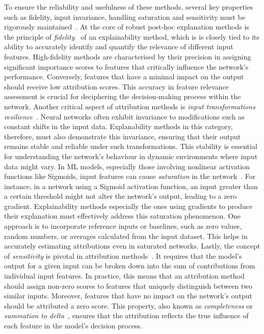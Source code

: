 To ensure the reliability and usefulness of these methods, several key properties such as fidelity, input invariance, handling saturation and sensitivity must be rigorously maintained~\cite{NielsenDRRB22}. At the core of robust post-hoc explanation methods is the principle of \emph{fidelity}~\cite{TomsettHCGP20} of an explainability method, which is is closely tied to its ability to accurately identify and quantify the relevance of different input features. High-fidelity methods are characterised by their precision in assigning significant importance scores to features that critically influence the network's performance. Conversely, features that have a minimal impact on the output should receive low attribution scores. This accuracy in feature relevance assessment is crucial for deciphering the decision-making process within the network. Another critical aspect of attribution methods is \emph{input transformations resilience}~\cite{KindermansHAASDEK19, 11700}. Neural networks often exhibit invariance to modifications such as constant shifts in the input data. Explanability methods in this category, therefore, must also demonstrate this invariance, ensuring that their output remains stable and reliable under such transformations. This stability is essential for understanding the network's behaviour in dynamic environments where input data might vary. In ML models, especially those involving nonlinear activation functions like Sigmoids, input features can cause \emph{saturation} in the network~\cite{SundararajanTY17}. For instance, in a network using a Sigmoid activation function, an input greater than a certain threshold might not alter the network's output, leading to a zero gradient. Explainability methods especially the ones using gradients to produce their explanation must effectively address this saturation phenomenon. One approach is to incorporate reference inputs or baselines, such as zero values, random numbers, or averages calculated from the input dataset. This helps in accurately estimating attributions even in saturated networks. Lastly, the concept of \emph{sensitivity} is pivotal in attribution methods~\cite{AnconaCOG19, 11700}. It requires that the model's output for a given input can be broken down into the sum of contributions from individual input features. In practice, this means that an attribution method should assign non-zero scores to features that uniquely distinguish between two similar inputs. Moreover, features that have no impact on the network's output should be attributed a zero score. This property, also known as \emph{completeness} or \emph{summation to delta}~\cite{SundararajanTY17, ShrikumarGK17}, ensures that the attribution reflects the true influence of each feature in the model's decision process.



